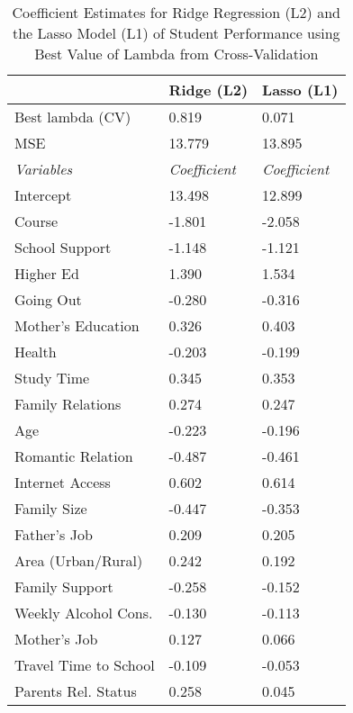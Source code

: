 \documentclass[sigconf]{acmart}
\begin{document}
\begin{table}
  \caption{Coefficient Estimates for Ridge Regression (L2) and the Lasso Model
  (L1) of Student Performance using Best Value of Lambda from Cross-Validation}
  \label{tab:freq}
  \begin{tabular}{lll}
    \toprule    
                        &   Ridge (L2)  & Lasso (L1) \\
    \midrule
    Best lambda (CV)    &    0.819      &  0.071    \\
    MSE                 &   13.779      & 13.895    \\
    \midrule
    \textit{Variables}  & \textit{Coefficient} &  \textit{Coefficient} \\
    \midrule
    Intercept           &   13.498      &   12.899   \\
    Course              &   -1.801      &   -2.058   \\
    School Support      &   -1.148      &   -1.121   \\
    Higher Ed           &    1.390      &    1.534   \\
    Going Out           &   -0.280      &   -0.316   \\
    Mother's Education  &    0.326      &    0.403   \\
    Health              &   -0.203      &   -0.199   \\
    Study Time          &    0.345      &    0.353   \\
    Family Relations    &    0.274      &    0.247   \\
    Age                 &   -0.223      &   -0.196   \\
    Romantic Relation   &   -0.487      &   -0.461   \\
    Internet Access     &    0.602      &    0.614   \\
    Family Size         &   -0.447      &   -0.353   \\
    Father's Job        &    0.209      &    0.205   \\
    Area (Urban/Rural)  &    0.242      &    0.192   \\
    Family Support      &   -0.258      &   -0.152   \\ 
    Weekly Alcohol Cons.&   -0.130      &   -0.113   \\
    Mother's Job        &    0.127      &    0.066   \\
    Travel Time to School & -0.109      &   -0.053   \\
    Parents Rel. Status &    0.258      &    0.045   \\    

\end{tabular}
\end{table}
\end{document}
